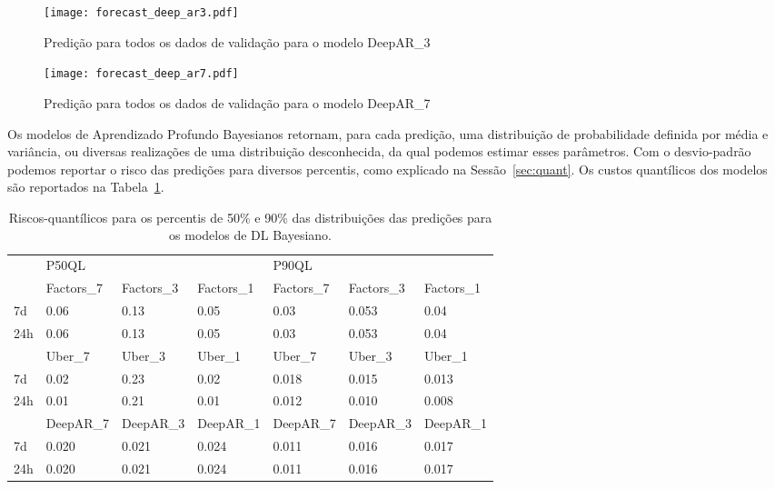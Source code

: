 \begin{figure}[H]
  \centering
  \texttt{[image: forecast\_deep\_ar3.pdf]} 
  \caption{Predição para todos os dados de validação para o modelo DeepAR\_3}
  \label{fig:fordeepar3}
\end{figure}

\begin{figure}[H]
  \centering
  \texttt{[image: forecast\_deep\_ar7.pdf]} 
  \caption{Predição para todos os dados de validação para o modelo DeepAR\_7}
  \label{fig:fordeepar7}
\end{figure}


Os modelos de Aprendizado Profundo Bayesianos retornam, para cada predição, uma distribuição de
probabilidade definida por média e variância, ou diversas realizações de uma
distribuição desconhecida, da qual podemos estimar esses parâmetros. 
Com o desvio-padrão podemos reportar o risco das predições para diversos percentis, como explicado na
Sessão~\ref{sec:quant}. Os custos quantílicos dos modelos são reportados na
Tabela~\ref{tb:quants}.


\begin{center}
\begin{table}
  \begin{tabular}{l|l|l|l|l|l|l|}
    \cline{2-7}
    & \multicolumn{3}{l|}{P50QL}                       & \multicolumn{3}{l|}{P90QL}                       \\ \cline{2-7} 
    & Factors\_7 & Factors\_3 & Factors\_1 & Factors\_7 & Factors\_3 & Factors\_1 \\ \hline
    \multicolumn{1}{|l|}{7d}  & 0.06           & 0.13           & 0.05           & 0.03           & 0.053          & 0.04           \\ \hline
    \multicolumn{1}{|l|}{24h} & 0.06           & 0.13           & 0.05           & 0.03           & 0.053          & 0.04           \\ \hline
    & Uber\_7 & Uber\_3 & Uber\_1 & Uber\_7 & Uber\_3 & Uber\_1 \\ \hline
    \multicolumn{1}{|l|}{7d}  & 0.02    & 0.23    & 0.02    & 0.018    & 0.015   & 0.013    \\ \hline
    \multicolumn{1}{|l|}{24h} & 0.01    & 0.21    & 0.01    & 0.012   & 0.010   & 0.008    \\ \hline
    & DeepAR\_7 & DeepAR\_3 & DeepAR\_1 & DeepAR\_7 & DeepAR\_3 & DeepAR\_1 \\ \hline
    \multicolumn{1}{|l|}{7d}  & 0.020     & 0.021     & 0.024     & 0.011     & 0.016     & 0.017     \\ \hline
    \multicolumn{1}{|l|}{24h} &  0.020     & 0.021     & 0.024     & 0.011     & 0.016     & 0.017     \\ \hline
  \end{tabular}
  \caption{Riscos-quantílicos para os percentis de 50\% e 90\% das distribuições
    das predições para os modelos de DL Bayesiano.}
  \label{tb:quants}
\end{table}
\end{center}


